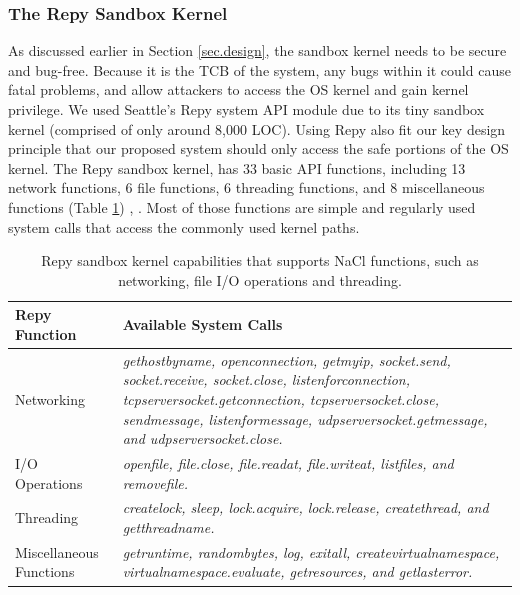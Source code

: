 
\subsubsection{The Repy Sandbox Kernel}

As discussed earlier in Section \ref{sec.design}, the sandbox kernel needs to be secure and bug-free.
Because it is the TCB of the system, any bugs within it could cause fatal problems,
and allow attackers to access the OS kernel and gain kernel privilege.
We used Seattle's Repy system API module due to its tiny sandbox kernel
(comprised of only around 8,000 LOC). Using Repy also fit our key design principle that
our proposed system should only access the safe portions of the OS kernel.
The Repy sandbox kernel, has 33 basic API functions, including 13 network functions,
6 file functions, 6 threading functions,
and 8 miscellaneous functions
 (Table \ref{table:RepyKernel}) \cite{Repy-10}, \cite{RepyKernel}. Most of those functions are simple and
regularly used system calls that access the commonly used kernel paths.


\begin{table}
\centering
\caption {Repy sandbox kernel capabilities that supports NaCl functions, such as networking, file I/O operations and threading.}

  \begin{tabular}{ | p{2.5cm} | p{4.5cm} |}
  \hline
  \textbf{Repy Function} & \textbf{Available System Calls}  \\ \hline

Networking & \emph{gethostbyname, openconnection, getmyip, socket.send, socket.receive, socket.close,
listenforconnection, tcpserversocket.getconnection, tcpserversocket.close, sendmessage, listenformessage,
udpserversocket.getmessage, and udpserversocket.close.} \\ \hline

I/O Operations & \emph{openfile, file.close, file.readat, file.writeat, listfiles, and removefile.} \\ \hline

Threading & \emph{createlock, sleep, lock.acquire, lock.release, createthread, and getthreadname.} \\ \hline

Miscellaneous Functions & \emph{getruntime, randombytes, log, exitall, createvirtualnamespace,
virtualnamespace.evaluate, getresources, and getlasterror.}  \\ \hline
    \end{tabular}
    \label{table:RepyKernel}
\end{table}

